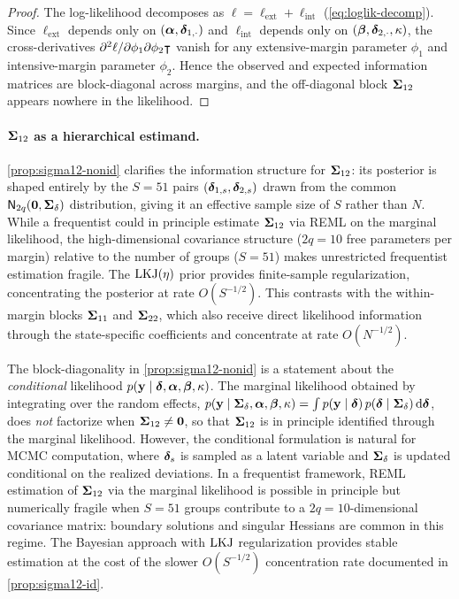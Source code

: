 \begin{proof}
  The log-likelihood decomposes as $\ell = \ell_{\mathrm{ext}} + \ell_{\mathrm{int}}$
  (\cref{eq:loglik-decomp}). Since $\ell_{\mathrm{ext}}$ depends only on
  $(\boldsymbol{\alpha}, \boldsymbol{\delta}_{1,\cdot})$ and $\ell_{\mathrm{int}}$ depends only on
  $(\boldsymbol{\beta}, \boldsymbol{\delta}_{2,\cdot}, \kappa)$, the cross-derivatives
  $\partial^2 \ell / \partial\phi_1 \partial\phi_2\intercal$ vanish for any
  extensive-margin parameter $\phi_1$ and intensive-margin parameter $\phi_2$.
  Hence the observed and expected information matrices are block-diagonal
  across margins, and the off-diagonal block $\boldsymbol{\Sigma}_{12}$ appears nowhere
  in the likelihood.
\end{proof}

\paragraph{$\boldsymbol{\Sigma}_{12}$ as a hierarchical estimand.}
\cref{prop:sigma12-nonid} clarifies the information structure for
$\boldsymbol{\Sigma}_{12}$: its posterior is shaped entirely by the $S = 51$ pairs
$(\boldsymbol{\delta}_{1,s}, \boldsymbol{\delta}_{2,s})$ drawn from the common
$\textsf{N}_{2q}(\mathbf{0}, \boldsymbol{\Sigma}_\delta)$ distribution, giving it an
effective sample size of $S$ rather than $N$.  While a frequentist could
in principle estimate $\boldsymbol{\Sigma}_{12}$ via REML on the marginal
likelihood, the high-dimensional covariance structure ($2q = 10$
free parameters per margin) relative to the number of groups ($S = 51$)
makes unrestricted frequentist estimation fragile.  The $\operatorname{LKJ}(\eta)$
prior provides finite-sample regularization, concentrating the posterior
at rate $O(S^{-1/2})$. This contrasts with the within-margin blocks
$\boldsymbol{\Sigma}_{11}$ and $\boldsymbol{\Sigma}_{22}$, which also receive direct likelihood
information through the state-specific coefficients and concentrate at
rate $O(N^{-1/2})$.

\begin{remark}\label{rem:cond-vs-marg}
  The block-diagonality in \cref{prop:sigma12-nonid} is a statement
  about the \emph{conditional} likelihood $p(\mathbf{y} \mid \boldsymbol{\delta},
  \boldsymbol{\alpha}, \boldsymbol{\beta}, \kappa)$.  The marginal likelihood obtained by
  integrating over the random effects,
  $p(\mathbf{y} \mid \boldsymbol{\Sigma}_\delta, \boldsymbol{\alpha}, \boldsymbol{\beta}, \kappa) = \int
  p(\mathbf{y} \mid \boldsymbol{\delta}) \, p(\boldsymbol{\delta} \mid \boldsymbol{\Sigma}_\delta) \,
  \mathrm{d}\boldsymbol{\delta}$, does \emph{not} factorize when $\boldsymbol{\Sigma}_{12}
  \neq \mathbf{0}$, so that $\boldsymbol{\Sigma}_{12}$ is in principle identified
  through the marginal likelihood.  However, the conditional
  formulation is natural for MCMC computation, where $\boldsymbol{\delta}_s$ is
  sampled as a latent variable and $\boldsymbol{\Sigma}_\delta$ is updated
  conditional on the realized deviations.  In a frequentist framework,
  REML estimation of $\boldsymbol{\Sigma}_{12}$ via the marginal likelihood is
  possible in principle but numerically fragile when $S = 51$ groups
  contribute to a $2q = 10$-dimensional covariance matrix: boundary
  solutions and singular Hessians are common in this regime.  The
  Bayesian approach with $\operatorname{LKJ}$ regularization provides stable
  estimation at the cost of the slower $O(S^{-1/2})$ concentration
  rate documented in \cref{prop:sigma12-id}.
\end{remark}

